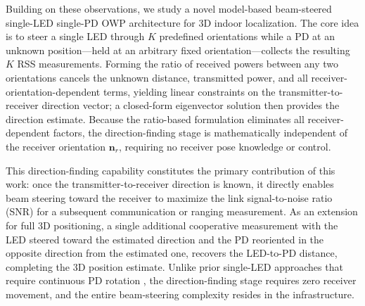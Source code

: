 \documentclass[journal]{IEEEtran}
\begin{document}
Building on these observations, we study a novel model-based beam-steered single-LED single-PD OWP architecture for 3D indoor localization. The core idea is to steer a single LED through $K$ predefined orientations while a PD at an unknown position---held at an arbitrary fixed orientation---collects the resulting $K$ RSS measurements. Forming the ratio of received powers between any two orientations cancels the unknown distance, transmitted power, and all receiver-orientation-dependent terms, yielding linear constraints on the transmitter-to-receiver direction vector; a closed-form eigenvector solution then provides the direction estimate. Because the ratio-based formulation eliminates all receiver-dependent factors, the direction-finding stage is mathematically independent of the receiver orientation $\mathbf{n}_r$, requiring no receiver pose knowledge or control.

This direction-finding capability constitutes the primary contribution of this work: once the transmitter-to-receiver direction is known, it directly enables beam steering toward the receiver to maximize the link signal-to-noise ratio (SNR) for a subsequent communication or ranging measurement. As an extension for full 3D positioning, a single additional cooperative measurement with the LED steered toward the estimated direction and the PD reoriented in the opposite direction from the estimated one, recovers the LED-to-PD distance, completing the 3D position estimate. Unlike prior single-LED approaches that require continuous PD rotation \cite{Liu2022, Wang2024, Shi2025}, the direction-finding stage requires zero receiver movement, and the entire beam-steering complexity resides in the infrastructure.
\end{document}
